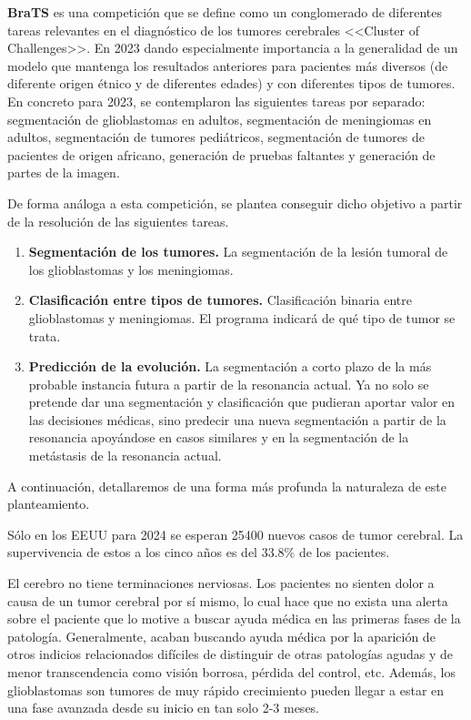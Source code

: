 \textbf{BraTS} es una competición que se define como un conglomerado de diferentes tareas relevantes en el diagnóstico de los tumores cerebrales <<Cluster of Challenges>>. En 2023 dando especialmente importancia a la generalidad de un modelo que mantenga los resultados anteriores para pacientes más diversos (de diferente origen étnico y de diferentes edades) y con diferentes tipos de tumores. En concreto para 2023, se contemplaron las siguientes tareas por separado: segmentación de glioblastomas en adultos, segmentación de meningiomas en adultos, segmentación de tumores pediátricos, segmentación de tumores de pacientes de origen africano, generación de pruebas faltantes y generación de partes de la imagen.

De forma análoga a esta competición, se plantea conseguir dicho objetivo a partir de la resolución de las siguientes tareas.

\begin{enumerate}
	\item \textbf{Segmentación de los tumores.} 
	La segmentación de la lesión tumoral de los glioblastomas y los meningiomas.
	\item \textbf{Clasificación entre tipos de tumores.} Clasificación binaria entre glioblastomas y meningiomas. El programa indicará de qué tipo de tumor se trata.
	\item \textbf{Predicción de la evolución.} La segmentación a corto plazo de la más probable instancia futura a partir de la resonancia actual. Ya no solo se pretende dar una segmentación y clasificación que pudieran aportar valor en las decisiones médicas, sino predecir una nueva segmentación a partir de la resonancia apoyándose en casos similares y en la segmentación de la metástasis de la resonancia actual.
\end{enumerate}

A continuación, detallaremos de una forma más profunda la naturaleza de este planteamiento.

Sólo en los EEUU para 2024 se esperan 25400 nuevos casos de tumor cerebral. La supervivencia de estos a los cinco años es del $33.8 \%$ de los pacientes. \cite{cancerorg}

El cerebro no tiene terminaciones nerviosas. Los pacientes no sienten dolor a causa de un tumor cerebral por sí mismo, lo cual hace que no exista una alerta sobre el paciente que lo motive a buscar ayuda médica en las primeras fases de la patología. Generalmente, acaban buscando ayuda médica por la aparición de otros indicios relacionados difíciles de distinguir de otras patologías agudas y de menor transcendencia como visión borrosa, pérdida del control, etc. Además, los glioblastomas son tumores de muy rápido crecimiento pueden llegar a estar en una fase avanzada desde su inicio en tan solo 2-3 meses.

